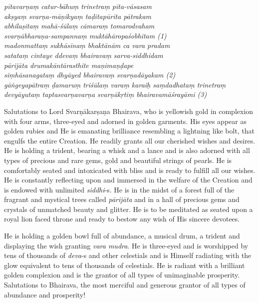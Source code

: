 \documentclass[11pt,oneside,a4paper]{article}
\newenvironment{shloka}[1]
  {\bigskip\center#1\varwidth{\linewidth}}
  {\endvarwidth\endcenter\bigskip}
\newcommand{\tl}[1]{\emph{#1}}
\begin{document}
\begin{shloka}\itshape
pītavarṇaṃ catur-bāhuṃ trinetraṃ pīta-vāsasam\\
akṣyaṃ svarṇa-māṇikyaṃ taḍitapūrita pātrakam\\
abhilaṣitaṃ mahā-śūlaṃ cāmaraṃ tomarodvaham\\
svarṇābharaṇa-sampannaṃ muktāhāropaśobhitam (1)\\

madonmattaṃ sukhāsīnaṃ bhaktānām ca vara pradam\\
satataṃ cintaye ddevaṃ bhairavaṃ sarva-siddhidam\\
pārijāta drumakāntārasthite maṇimaṇḍape\\
siṃhāsanagataṃ dhyāyed bhairavaṃ svarṇadāyakam (2)\\

gāṅgeyapātraṃ ḍamaruṃ triśūlaṃ varaṃ karaiḥ saṃdadhataṃ trinetraṃ\\
devyāyutaṃ taptasvarṇavarṇa svarṇākṛtiṃ bhairavamāśrayāmi (3)
\end{shloka}

Salutations to Lord Svarṇākarṣaṇa Bhairava, who is yellowish gold in complexion
with four arms, three-eyed and adorned in golden garments. His eyes appear as
golden rubies and He is emanating brilliance resembling a lightning like bolt,
that engulfs the entire Creation. He readily grants all our cherished wishes
and desires. He is holding a trident, bearing a whisk and a lance and is also
adorned with all types of precious and rare gems, gold and beautiful strings of
pearls. He is comfortably seated and intoxicated with bliss and is ready to
fulfill all our wishes. He is constantly reflecting upon and immersed in
the welfare of the Creation and is endowed with unlimited \tl{siddhi}-s. He is
in the midst of a forest full of the fragrant and mystical trees called
\tl{pārijāta} and in a hall of precious gems and crystals of unmatched beauty
and glitter. He is to be meditated as seated upon a royal lion faced throne and
ready to bestow any wish of His sincere devotees.

He is holding a golden bowl full of abundance, a musical drum, a trident and
displaying the wish granting \tl{vara mudra}. He is three-eyed and is worshipped
by tens of thousands of \tl{deva}-s and other celestials and is Himself
radiating with the glow equivalent to tens of thousands of celestials. He is
radiant with a brilliant golden complexion and is the grantor of all types of
unimaginable prosperity. Salutations to Bhairava, the most merciful and generous
grantor of all types of abundance and prosperity!
\end{document}
